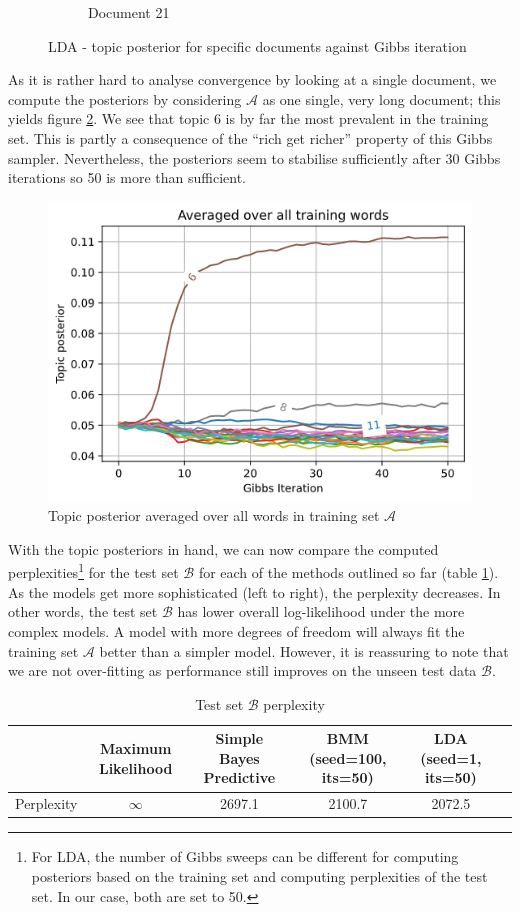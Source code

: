 \documentclass[]{article}
\newcommand{\Acal}{\mathcal{A}}
\newcommand{\Bcal}{\mathcal{B}}
\newcommand{\figwidth}{0.4\linewidth}
\begin{document}
\begin{figure}[!h]
\begin{subfigure}{0.33\linewidth}
		\caption{Document 21}	
	\end{subfigure}
	\caption{LDA - topic posterior for specific documents against Gibbs iteration}
	\label{fig:lda-post-per-doc}
\end{figure}

As it is rather hard to analyse convergence by looking at a single document, we compute the posteriors by considering $\Acal$ as one single, very long document; this yields figure \ref{fig:lda-post-av}. We see that topic 6 is by far the most prevalent in the training set. This is partly a consequence of the ``rich get richer'' property of this Gibbs sampler. Nevertheless, the posteriors seem to stabilise sufficiently after 30 Gibbs iterations so 50 is more than sufficient.
%
\begin{figure}[!h]
	\centering
	\includegraphics[width=\figwidth]{lda-topic-post-average.png}
	\caption{Topic posterior averaged over all words in training set $\Acal$}
	\label{fig:lda-post-av}
\end{figure}

With the topic posteriors in hand, we can now compare the computed perplexities\footnote{For LDA, the number of Gibbs sweeps can be different for computing posteriors based on the training set and computing perplexities of the test set. In our case, both are set to 50.} for the test set $\Bcal$ for each of the methods outlined so far (table \ref{tab:perplex-comp}). As the models get more sophisticated (left to right), the perplexity decreases. In other words, the test set $\Bcal$ has lower overall log-likelihood under the more complex models. A model with more degrees of freedom will always fit the training set $\Acal$ better than a simpler model. However, it is reassuring to note that we are not over-fitting as performance still improves on the unseen test data $\Bcal$.
%
\begin{table}[!h]
	\centering
	\begin{tabular}{c | c c c c c}
		& Maximum Likelihood & Simple Bayes Predictive & BMM (seed=100, its=50) & LDA (seed=1, its=50) \\ \hline
		Perplexity & $\infty$ & 2697.1 & 2100.7 & 2072.5 
	\end{tabular}
\caption{Test set $\Bcal$ perplexity}
\label{tab:perplex-comp}
\end{table}
\end{document}
